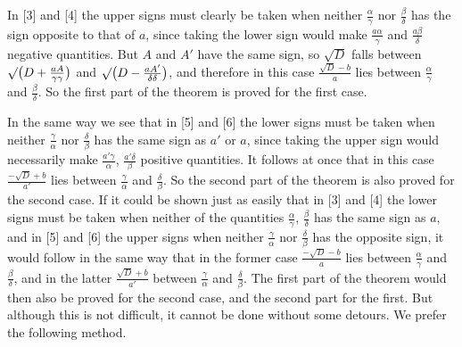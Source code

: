 In [3] and [4] the upper signs must clearly be taken when neither $\frac{\alpha}{\gamma}$ nor $\frac{\beta}{\delta}$ has the sign opposite to that of $a$, since taking the lower sign would make $\frac{a\alpha}{\gamma}$ and $\frac{a\beta}{\delta}$ negative quantities. But $A$ and $A'$ have the same sign, so $\surd D$ falls between $\surd\bigl(D+\frac{aA}{\gamma\gamma}\bigr)$ and $\surd\bigl(D-\frac{aA'}{\delta\delta}\bigr)$, and therefore in this case $\frac{\surd D-b}{a}$ lies between $\frac{\alpha}{\gamma}$ and $\frac{\beta}{\delta}$. So the first part of the theorem is proved for the first case.

In the same way we see that in [5] and [6] the lower signs must be taken when neither $\frac{\gamma}{\alpha}$ nor $\frac{\delta}{\beta}$ has the same sign as $a'$ or $a$, since taking the upper sign would necessarily make $\frac{a'\gamma}{\alpha}$, $\frac{a'\delta}{\beta}$ positive quantities. It follows at once that in this case $\frac{-\surd D+b}{a'}$ lies between $\frac{\gamma}{\alpha}$ and $\frac{\delta}{\beta}$. So the second part of the theorem is also proved for the second case. If it could be shown just as easily that in [3] and [4] the lower signs must be taken when neither of the quantities $\frac{\alpha}{\gamma}$, $\frac{\beta}{\delta}$ has the same sign as $a$, and in [5] and [6] the upper signs when neither $\frac{\gamma}{\alpha}$ nor $\frac{\delta}{\beta}$ has the opposite sign, it would follow in the same way that in the former case $\frac{-\surd D-b}{a}$ lies between $\frac{\alpha}{\gamma}$ and $\frac{\beta}{\delta}$, and in the latter $\frac{\surd D+b}{a'}$ between $\frac{\gamma}{\alpha}$ and $\frac{\delta}{\beta}$. The first part of the theorem would then also be proved for the second case, and the second part for the first. But although this is not difficult, it cannot be done without some detours. We prefer the following method.

